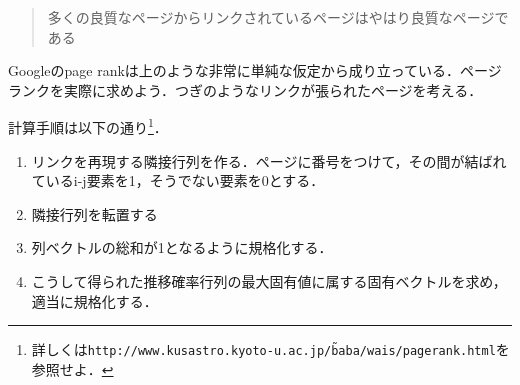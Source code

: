 \begin{quote}
多くの良質なページからリンクされているページはやはり良質なページである
\end{quote}
Googleのpage rankは上のような非常に単純な仮定から成り立っている．ページランクを実際に求めよう．つぎのようなリンクが張られたページを考える．

計算手順は以下の通り\footnote{詳しくは\texttt{http://www.kusastro.kyoto-u.ac.jp/\~baba/wais/pagerank.html}を参照せよ．}．
\begin{enumerate}
\item リンクを再現する隣接行列を作る．ページに番号をつけて，その間が結ばれているi-j要素を1，そうでない要素を0とする．
\item 隣接行列を転置する
\item 列ベクトルの総和が1となるように規格化する．
\item こうして得られた推移確率行列の最大固有値に属する固有ベクトルを求め，適当に規格化する．
\end{enumerate}

